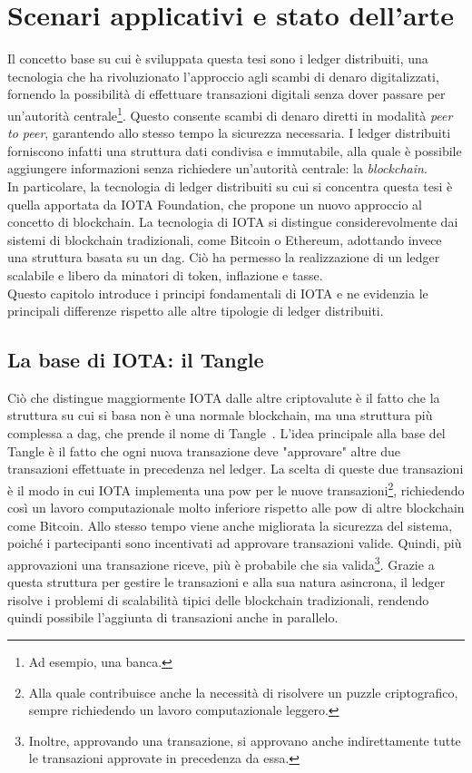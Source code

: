 \documentclass[12pt,a4paper,openright,twoside]{report}
\begin{document}
\chapter{Scenari applicativi e stato dell'arte}
\label{chap:stateofart}
Il concetto base su cui è sviluppata questa tesi sono i ledger distribuiti, una tecnologia che ha rivoluzionato l'approccio agli scambi di denaro digitalizzati, fornendo la possibilità di effettuare transazioni digitali senza dover passare per un'autorità centrale\footnote{Ad esempio, una banca.}. Questo consente scambi di denaro diretti in modalità \textit{peer to peer}, garantendo allo stesso tempo la sicurezza necessaria. I ledger distribuiti forniscono infatti una struttura dati condivisa e immutabile, alla quale è possibile aggiungere informazioni senza richiedere un’autorità centrale: la \textit{blockchain}.\\
In particolare, la tecnologia di ledger distribuiti su cui si concentra questa tesi è quella apportata da IOTA Foundation, che propone un nuovo approccio al concetto di blockchain. La tecnologia di IOTA si distingue considerevolmente dai sistemi di blockchain tradizionali, come Bitcoin o Ethereum, adottando invece una struttura basata su un \acrfull{dag}. Ciò ha permesso la realizzazione di un ledger scalabile e libero da minatori di token, inflazione e tasse.\\
Questo capitolo introduce i principi fondamentali di IOTA e ne evidenzia le principali differenze rispetto alle altre tipologie di ledger distribuiti.

\section{La base di IOTA: il Tangle}
Ciò che distingue maggiormente IOTA dalle altre criptovalute è il fatto che la struttura su cui si basa non è una normale blockchain, ma una struttura più complessa a \acrfull{dag}, che prende il nome di Tangle~\cite{tangle}. L'idea principale alla base del Tangle è il fatto che ogni nuova transazione deve "approvare" altre due transazioni effettuate in precedenza nel ledger. La scelta di queste due transazioni è il modo in cui IOTA implementa una \acrfull{pow} per le nuove transazioni\footnote{Alla quale contribuisce anche la necessità di risolvere un puzzle criptografico, sempre richiedendo un lavoro computazionale leggero.}, richiedendo così un lavoro computazionale molto inferiore rispetto alle \acrshort{pow} di altre blockchain come Bitcoin. Allo stesso tempo viene anche migliorata la sicurezza del sistema, poiché i partecipanti sono incentivati ad approvare transazioni valide. Quindi, più approvazioni una transazione riceve, più è probabile che sia valida\footnote{Inoltre, approvando una transazione, si approvano anche indirettamente tutte le transazioni approvate in precedenza da essa.}. Grazie a questa struttura per gestire le transazioni e alla sua natura asincrona, il ledger risolve i problemi di scalabilità tipici delle blockchain tradizionali, rendendo quindi possibile l'aggiunta di transazioni anche in parallelo. 
\end{document}

